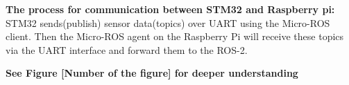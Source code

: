 \textbf{The process for communication between STM32 and Raspberry pi:}
STM32 sends(publish) sensor data(topics) over UART using the Micro-ROS client. Then the Micro-ROS agent on the Raspberry Pi will receive these topics via the UART interface and forward them to the ROS-2.


\textbf{See Figure [Number of the figure] for deeper understanding}


